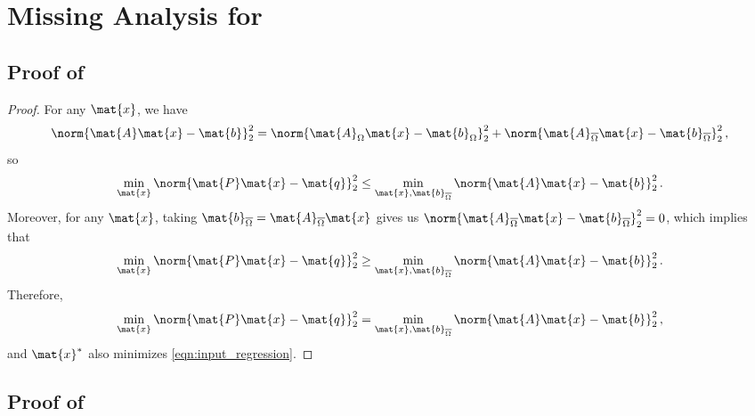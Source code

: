 \section{Missing Analysis for }
\label{app:lifted_regression}


\subsection{Proof of }

\LiftedRegression*

\begin{proof}
For any $\mat{x}$, we have
\[
    \norm{\mat{A}\mat{x}-\mat{b}}_2^2
    =
    \norm{\mat{A}_{\Omega}\mat{x} - \mat{b}_{\Omega}}_{2}^2
    +
    \norm{\mat{A}_{\overline\Omega}\mat{x} - \mat{b}_{\overline\Omega}}_{2}^2\,,
\]
so
\[
\min_{\mat{x}}\norm{\mat{P} \mat{x} - \mat{q}}_2^2 \leq \min_{\mat{x},\mat{b}_{\overline{\Omega}}} \norm{\mat{A}\mat{x}-\mat{b}}_2^2\,.
\]
Moreover, for any $\mat{x}$, taking $\mat{b}_{\overline \Omega} = \mat{A}_{\overline \Omega}\mat{x}$ gives us $\norm{\mat{A}_{\overline\Omega}\mat{x} - \mat{b}_{\overline\Omega}}_{2}^2=0$, which implies that
\[
\min_{\mat{x}} \norm{\mat{P} \mat{x} - \mat{q}}_2^2 \geq \min_{\mat{x},\mat{b}_{\overline{\Omega}}} \norm{\mat{A}\mat{x}-\mat{b}}_2^2\,.
\]
Therefore,
\[
\min_{\mat{x}}\norm{\mat{P} \mat{x} - \mat{q}}_2^2 = \min_{\mat{x},\mat{b}_{\overline{\Omega}}} \norm{\mat{A}\mat{x}-\mat{b}}_2^2\,,
\]
and $\mat{x}^*$ also minimizes \eqref{eqn:input_regression}.
\end{proof}

\subsection{Proof of }

\ConvexQuadratic*


